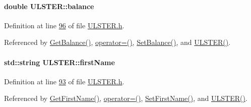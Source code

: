 \paragraph[{\texorpdfstring{balance}{balance}}]{\setlength{\rightskip}{0pt plus 5cm}double U\+L\+S\+T\+E\+R\+::balance\hspace{0.3cm}{\ttfamily [private]}}\hypertarget{class_u_l_s_t_e_r_af98d3ed41f452b28f26994552465815c_af98d3ed41f452b28f26994552465815c}{}\label{class_u_l_s_t_e_r_af98d3ed41f452b28f26994552465815c_af98d3ed41f452b28f26994552465815c}


Definition at line \hyperlink{_u_l_s_t_e_r_8h_source_l00096}{96} of file \hyperlink{_u_l_s_t_e_r_8h_source}{U\+L\+S\+T\+E\+R.\+h}.



Referenced by \hyperlink{_u_l_s_t_e_r_8cpp_source_l00075}{Get\+Balance()}, \hyperlink{_u_l_s_t_e_r_8h_source_l00062}{operator=()}, \hyperlink{_u_l_s_t_e_r_8cpp_source_l00071}{Set\+Balance()}, and \hyperlink{_u_l_s_t_e_r_8h_source_l00024}{U\+L\+S\+T\+E\+R()}.

\paragraph[{\texorpdfstring{first\+Name}{firstName}}]{\setlength{\rightskip}{0pt plus 5cm}std\+::string U\+L\+S\+T\+E\+R\+::first\+Name\hspace{0.3cm}{\ttfamily [private]}}\hypertarget{class_u_l_s_t_e_r_af8d138fdca14b59130b8b4ddd3d73b16_af8d138fdca14b59130b8b4ddd3d73b16}{}\label{class_u_l_s_t_e_r_af8d138fdca14b59130b8b4ddd3d73b16_af8d138fdca14b59130b8b4ddd3d73b16}


Definition at line \hyperlink{_u_l_s_t_e_r_8h_source_l00093}{93} of file \hyperlink{_u_l_s_t_e_r_8h_source}{U\+L\+S\+T\+E\+R.\+h}.



Referenced by \hyperlink{_u_l_s_t_e_r_8cpp_source_l00099}{Get\+First\+Name()}, \hyperlink{_u_l_s_t_e_r_8h_source_l00062}{operator=()}, \hyperlink{_u_l_s_t_e_r_8cpp_source_l00095}{Set\+First\+Name()}, and \hyperlink{_u_l_s_t_e_r_8h_source_l00024}{U\+L\+S\+T\+E\+R()}.

